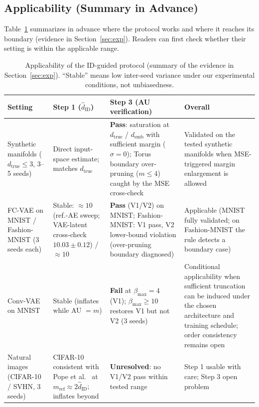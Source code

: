 \documentclass[make,article,submit,pdftex,moreauthors]{Definitions/mdpi}
\newcommand{\hatdID}{\hat{d}_{\mathrm{ID}}}
\newcommand{\dtrue}{d_{\mathrm{true}}}
\newcommand{\demb}{d_{\mathrm{emb}}}
\begin{document}
\subsection{Applicability (Summary in Advance)}\label{sec:protocol_applicability}

Table~\ref{tab:applicability} summarizes in advance where the protocol works
and where it reaches its boundary (evidence in Section~\ref{sec:exp}).
Readers can first check whether their setting is within the applicable
range.

\begin{table}[H]
\caption{Applicability of the ID-guided protocol (summary of the evidence in
Section~\ref{sec:exp}). ``Stable'' means low inter-seed variance under our
experimental conditions, not unbiasedness.}
\label{tab:applicability}
\small
\begin{tabular}{p{2.6cm}p{2.9cm}p{3.1cm}p{3.6cm}}
\toprule
\textbf{Setting} & \textbf{Step 1 ($\hatdID$)} & \textbf{Step 3 (AU verification)} & \textbf{Overall} \\
\midrule
Synthetic manifolds ($\dtrue \leq 3$, 3--5 seeds) & Direct input-space estimate; matches $\dtrue$ & \textbf{Pass}: saturation at $\dtrue$ / $\demb$ with sufficient margin ($\sigma = 0$); Torus boundary over-pruning ($m \leq 4$) caught by the MSE cross-check & Validated on the tested synthetic manifolds when MSE-triggered margin enlargement is allowed \\
\addlinespace
FC-VAE on MNIST / Fashion-MNIST (3 seeds each) & Stable: $\approx 10$ (ref.-AE sweep; VAE-latent cross-check $10.03 \pm 0.12$) / $\approx 10$ & \textbf{Pass} (V1/V2) on MNIST; Fashion-MNIST: V1 pass, V2 lower-bound violation (over-pruning boundary diagnosed) & Applicable (MNIST fully validated; on Fashion-MNIST the rule detects a boundary case) \\
\addlinespace
Conv-VAE on MNIST & Stable (inflates while AU $= m$) & \textbf{Fail} at $\beta_{\max} = 4$ (V1); $\beta_{\max} \geq 10$ restores V1 but not V2 (3 seeds) & Conditional applicability when sufficient truncation can be induced under the chosen architecture and training schedule; order consistency remains open \\
\addlinespace
Natural images (CIFAR-10 / SVHN, 3 seeds) & CIFAR-10 consistent with Pope et al.~\cite{pope2021intrinsic} at $m_{\mathrm{ref}} \approx 2\hatdID$; inflates beyond & \textbf{Unresolved}: no V1/V2 pass within tested range & Step 1 usable with care; Step 3 open problem \\
\bottomrule
\end{tabular}
\end{table}
\end{document}
